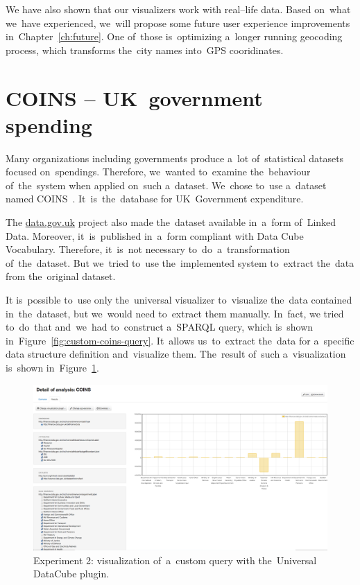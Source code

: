 We have also shown that our visualizers work with real--life data. Based on~what we~have experienced, we~will propose some future user experience 
improvements in~Chapter~\ref{ch:future}. One of~those is~optimizing a~longer running 
geocoding process, which transforms the~city names into~GPS cooridinates.

\section{COINS -- UK~government spending}
Many organizations including governments produce a~lot of~statistical datasets 
focused on~spendings. Therefore, we~wanted to~examine the~behaviour of~the~system when applied on~such a~dataset. We~chose to~use a~dataset named 
COINS~\cite{coins}. It~is~the~database for UK~Government expenditure.

The \url{data.gov.uk} project also made the~dataset available in~a~form of~Linked 
Data. Moreover, it~is~published in~a~form compliant with Data Cube Vocabulary.
Therefore, it~is~not necessary to~do~a~transformation of~the~dataset. But we~tried to~use the~implemented system to~extract the~data from the~original 
dataset.

It is~possible to~use only the~universal visualizer to~visualize the~data 
contained in~the~dataset, but we~would need to~extract them manually. In~fact, 
we tried to~do~that and~we~had to~construct a~SPARQL query, which is~shown
in~Figure~\ref{fig:custom-coins-query}. It~allows us~to~extract the~data for a~specific data structure 
definition and~visualize them. The~result of~such a~visualization is~shown in~Figure~\ref{fig:payola-exp-02}. 

\begin{figure}
  \centering
  \includegraphics[width=140mm]{img/payola-exp-02.png}
  \caption{Experiment 2: visualization of~a~custom query with the~Universal DataCube plugin.}
  \label{fig:payola-exp-02}
\end{figure}

